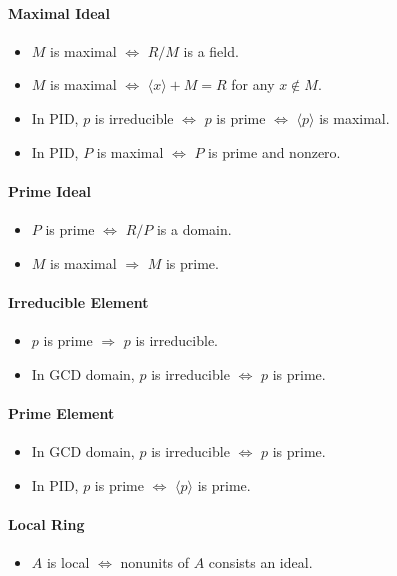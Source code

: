 \documentclass{article}
\begin{document}
\paragraph*{Maximal Ideal}
\begin{itemize}
    \item $M$ is maximal $\Leftrightarrow$ $R/M$ is a field.
    \item $M$ is maximal $\Leftrightarrow$ $\langle x \rangle + M = R$ for any $x\notin M$.
    \item In PID, $p$ is irreducible $\Leftrightarrow$ $p$ is prime $\Leftrightarrow$ $\langle p \rangle$ is maximal.
    \item In PID, $P$ is maximal $\Leftrightarrow$ $P$ is prime and nonzero.
\end{itemize}

\paragraph*{Prime Ideal}
\begin{itemize}
    \item $P$ is prime $\Leftrightarrow$ $R/P$ is a domain.
    \item $M$ is maximal $\Rightarrow$ $M$ is prime.
\end{itemize}

\paragraph*{Irreducible Element}
\begin{itemize}
    \item $p$ is prime $\Rightarrow$ $p$ is irreducible.
    \item In GCD domain, $p$ is irreducible $\Leftrightarrow$ $p$ is prime.
\end{itemize}

\paragraph*{Prime Element}
\begin{itemize}
    \item In GCD domain, $p$ is irreducible $\Leftrightarrow$ $p$ is prime.
    \item In PID, $p$ is prime $\Leftrightarrow$ $\langle p \rangle$ is prime.
\end{itemize}

\paragraph*{Local Ring}
\begin{itemize}
    \item $A$ is local $\Leftrightarrow$ nonunits of $A$ consists an ideal.
\end{itemize}

% 
% 
\end{document}
